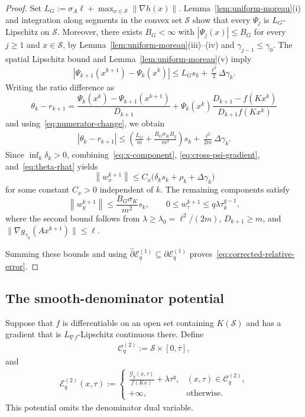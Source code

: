 \documentclass[9pt]{article}
\numberwithin{equation}{section}
\theoremstyle{definition}
\theoremstyle{remark}
\newcommand{\Sset}{\mathcal S}
\newcommand{\whpartial}{\widehat\partial}
\newcommand{\norm}[1]{\left\lVert #1\right\rVert}
\newcommand{\abs}[1]{\left\lvert #1\right\rvert}
\newcommand{\Gcal}{\mathcal G}
\newcommand{\Ecal}{\mathcal E}
\newcommand{\Ccal}{\mathcal C}
\begin{document}
\begin{proof}
Set $L_G:=\sigma_A\ell+\max_{x\in\Sset}\norm{\nabla h(x)}$.
Lemma~\ref{lem:uniform-moreau}(i) and integration along segments
in the convex set $\Sset$ show that every $\Psi_j$ is
$L_G$-Lipschitz on $\Sset$. Moreover, there exists $B_G<\infty$ with
$\abs{\Psi_j(x)}\leq B_G$ for every $j\geq1$ and $x\in\Sset$,
by Lemma~\ref{lem:uniform-moreau}(iii)--(iv) and $\gamma_{j-1}\leq\gamma_0$.
The spatial Lipschitz bound and Lemma~\ref{lem:uniform-moreau}(v) imply
\begin{eqnarray}\label{eq:numerator-change}
 \abs{\Psi_{k+1}(x^{k+1})-\Psi_k(x^k)}
 \leq L_Gs_k+\frac{\ell^2}{2}\Delta\gamma_k.
\end{eqnarray}
Writing the ratio difference as
\[
 \theta_k-r_{k+1}
 =\frac{\Psi_k(x^k)-\Psi_{k+1}(x^{k+1})}{D_{k+1}}
 +\Psi_k(x^k)\frac{D_{k+1}-f(Kx^k)}{D_{k+1}f(Kx^k)}
\]
and using~\eqref{eq:numerator-change}, we obtain
\begin{eqnarray}\label{eq:theta-rhat}
 \abs{\theta_k-r_{k+1}}
 \leq\left(\frac{L_G}{m}+\frac{B_G\sigma_K B_y}{m^2}\right)s_k
                 +\frac{\ell^2}{2m}\Delta\gamma_k.
\end{eqnarray}
Since $\inf_k\delta_k>0$, combining~\eqref{eq:x-component},
\eqref{eq:cross-psi-gradient}, and~\eqref{eq:theta-rhat} yields
\[
 \norm{w_x^{k+1}}
 \leq C_x\bigl(\delta_ks_k+\rho_k+\Delta\gamma_k\bigr)
\]
for some constant $C_x>0$ independent of $k$.
 The remaining components satisfy
\[
 \norm{w_y^{k+1}}\leq\frac{B_G \sigma_K}{m^2}s_k,
 \qquad 0\leq w_\tau^{k+1}\leq q\lambda\tau_k^{q-1},
\]
where the second bound follows from
$\lambda\geq\lambda_0=\ell^2/(2m)$, $D_{k+1}\geq m$, and
$\|\nabla g_{\gamma_k}(Ax^{k+1})\|\leq\ell$.

Summing these bounds and using
$\whpartial\Ecal_q^{(1)}\subseteq\partial\Ecal_q^{(1)}$
proves~\eqref{eq:corrected-relative-error}.
\end{proof}

\subsection{The smooth-denominator potential}
Suppose that $f$ is differentiable on an open set containing
$K(\Sset)$ and has a gradient that is
$L_{\nabla f}$-Lipschitz continuous there.
Define
\begin{eqnarray}\label{eq:C2-definition}
\Ccal_q^{(2)}:=\Sset\times[0,\overline\tau],
\end{eqnarray}
and
\begin{eqnarray}\label{eq:E2-definition}
\Ecal_q^{(2)}(x,\tau):=
 \begin{cases}
 \displaystyle\frac{\Gcal_q(x,\tau)}{f(Kx)}+\lambda\tau^q,
           &(x,\tau)\in\Ccal_q^{(2)},\\[1ex]
 +\infty,&\text{otherwise}.
 \end{cases}
\end{eqnarray}
This potential omits the denominator dual variable.
\end{document}
